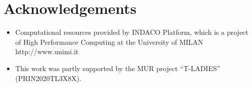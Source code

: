 \section*{Acknowledgements}
    
\begin{itemize}
    \item Computational resources provided by INDACO Platform, which is a project of High Performance Computing at the University of MILAN http://www.unimi.it
    \item This work was partly supported by the MUR project “T-LADIES” (PRIN2020TL3X8X).
\end{itemize}
